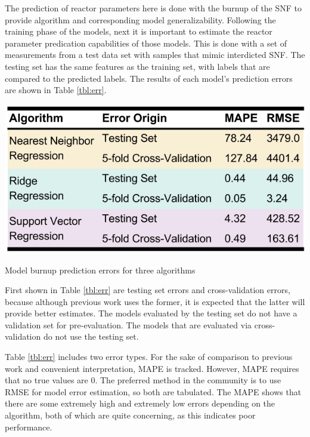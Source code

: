 The prediction of reactor parameters here is done with the burnup of the
\gls{SNF} to provide algorithm and corresponding model generalizability.
Following the training phase of the models, next it is important to estimate
the reactor parameter predication capabilities of those models. This is done
with a set of measurements from a test data set with samples that mimic
interdicted \gls{SNF}. The testing set has the same features as the training
set, with labels that are compared to the predicted labels. The results of each
model's prediction errors are shown in Table \ref{tbl:err}. 

\begin{table}[!htb]
  \centering
  \includegraphics[width=0.8\linewidth]{./chapters/demo_method/err.png}
  \caption{Model burnup prediction errors for three algorithms}
  \label{tbl:err}
\end{table}

First shown in Table \ref{tbl:err} are testing set errors and cross-validation
errors, because although previous work uses the former, it is expected that the
latter will provide better estimates.  The models evaluated by the testing set
do not have a validation set for pre-evaluation.  The models that are evaluated
via cross-validation do not use the testing set. 

Table \ref{tbl:err} includes two error types.  For the sake of comparison to
previous work and convenient interpretation, \gls{MAPE} is tracked. However,
\gls{MAPE} requires that no true values are $0$.  The preferred method in the
community is to use \gls{RMSE} for model error estimation, so both are
tabulated.  The \gls{MAPE} shows that there are some extremely high and
extremely low errors depending on the algorithm, both of which are quite
concerning, as this indicates poor performance.  

